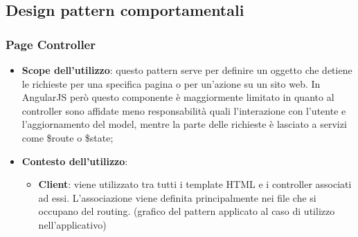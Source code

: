 %


\subsection{Design pattern comportamentali} %
\label{sub:design_pattern_comportamentali}
	\subsubsection{Page Controller} %
	\label{ssub:page_controller}
	\begin{itemize}
		\item \textbf{Scope dell'utilizzo}: questo pattern serve per definire un oggetto che detiene le richieste per una specifica pagina o per un'azione su un sito web. In AngularJS però questo componente è maggiormente limitato in quanto al controller sono affidate meno responsabilità quali l'interazione con l'utente e l'aggiornamento del model, mentre la parte delle richieste è lasciato a servizi come \$route o \$state;
		\item \textbf{Contesto dell'utilizzo}:
			\begin{itemize}
				\item \textbf{Client}: viene utilizzato tra tutti i template HTML e i controller associati ad essi. L'associazione viene definita principalmente nei file che si occupano del routing. \newline
				[TO DO] (grafico del pattern applicato al caso di utilizzo nell'applicativo)
			\end{itemize}
	\end{itemize}



